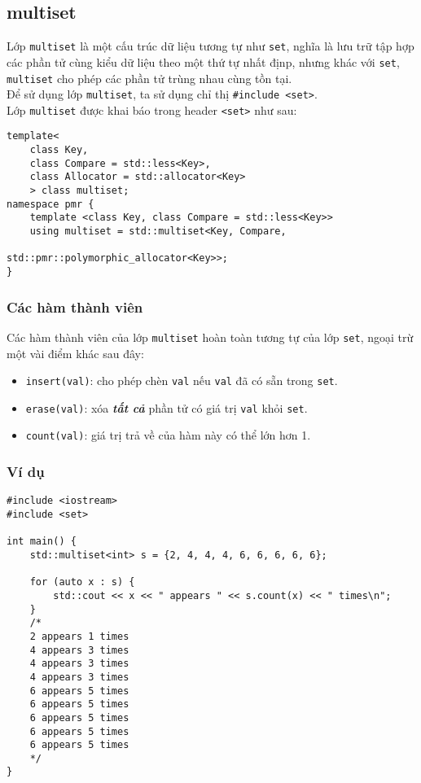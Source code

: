 \subsection{multiset}
Lớp \lstinline{multiset} là một cấu trúc dữ liệu tương tự như \lstinline{set}, nghĩa là lưu trữ  tập hợp các phần tử cùng kiểu dữ liệu theo một thứ tự nhất địnp, nhưng khác với \lstinline{set}, \lstinline{multiset} cho phép các phần tử trùng nhau cùng tồn tại.\\
Để sử dụng lớp \lstinline{multiset}, ta sử dụng chỉ thị \lstinline{#include <set>}.\\
Lớp \lstinline{multiset} được khai báo trong header \lstinline{<set>} như sau: \cite{multiset}
\begin{lstlisting}
template<
    class Key,
    class Compare = std::less<Key>, 
    class Allocator = std::allocator<Key>
    > class multiset;
namespace pmr {
    template <class Key, class Compare = std::less<Key>>
    using multiset = std::multiset<Key, Compare,
                                   std::pmr::polymorphic_allocator<Key>>;
}
\end{lstlisting}
\subsubsection{Các hàm thành viên}
Các hàm thành viên của lớp \lstinline{multiset} hoàn toàn tương tự của lớp \lstinline{set}, ngoại trừ một vài điểm khác sau đây:
\begin{itemize}
    \item \lstinline{insert(val)}: cho phép chèn \lstinline{val} nếu \lstinline{val} đã có sẵn trong \lstinline{set}.
    \item \lstinline{erase(val)}: xóa \textbf{\textit{tất cả}} phần tử có giá trị \lstinline{val} khỏi \lstinline{set}.
    \item \lstinline{count(val)}: giá trị trả về của hàm này có thể lớn hơn 1.
\end{itemize}
\subsubsection{Ví dụ}
\begin{lstlisting}
#include <iostream>
#include <set>
 
int main() {
    std::multiset<int> s = {2, 4, 4, 4, 6, 6, 6, 6, 6};
 
    for (auto x : s) {
        std::cout << x << " appears " << s.count(x) << " times\n";
    }
    /*
    2 appears 1 times
    4 appears 3 times
    4 appears 3 times
    4 appears 3 times
    6 appears 5 times
    6 appears 5 times
    6 appears 5 times
    6 appears 5 times
    6 appears 5 times
    */
}
\end{lstlisting}

